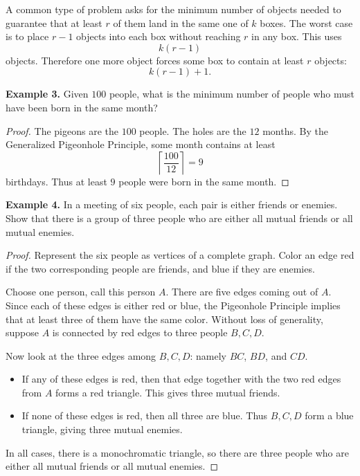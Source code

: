 \documentclass{article}
\begin{document}
A common type of problem asks for the minimum number of objects needed to guarantee that at least $r$ of them land in the same one of $k$ boxes. The worst case is to place $r-1$ objects into each box without reaching $r$ in any box. This uses
\[
    k(r-1)
\]
objects. Therefore one more object forces some box to contain at least $r$ objects:
\[
    k(r-1)+1.
\]

\vspace{2mm}
\noindent\textbf{Example 3.} Given $100$ people, what is the minimum number of people who must have been born in the same month?

\begin{proof}
The pigeons are the $100$ people. The holes are the $12$ months. By the Generalized Pigeonhole Principle, some month contains at least
\[
    \left\lceil \frac{100}{12}\right\rceil = 9
\]
birthdays. Thus at least $9$ people were born in the same month.
\end{proof}

\vspace{2mm}
\noindent\textbf{Example 4.} In a meeting of six people, each pair is either friends or enemies. Show that there is a group of three people who are either all mutual friends or all mutual enemies.

\begin{proof}
Represent the six people as vertices of a complete graph. Color an edge red if the two corresponding people are friends, and blue if they are enemies.

\vspace{1.5mm}
Choose one person, call this person $A$. There are five edges coming out of $A$. Since each of these edges is either red or blue, the Pigeonhole Principle implies that at least three of them have the same color. Without loss of generality, suppose $A$ is connected by red edges to three people $B,C,D$.

\vspace{1.5mm}
Now look at the three edges among $B,C,D$: namely $BC$, $BD$, and $CD$.
\begin{itemize}
    \item If any of these edges is red, then that edge together with the two red edges from $A$ forms a red triangle. This gives three mutual friends.
    \item If none of these edges is red, then all three are blue. Thus $B,C,D$ form a blue triangle, giving three mutual enemies.
\end{itemize}
In all cases, there is a monochromatic triangle, so there are three people who are either all mutual friends or all mutual enemies.
\end{proof}
\end{document}
